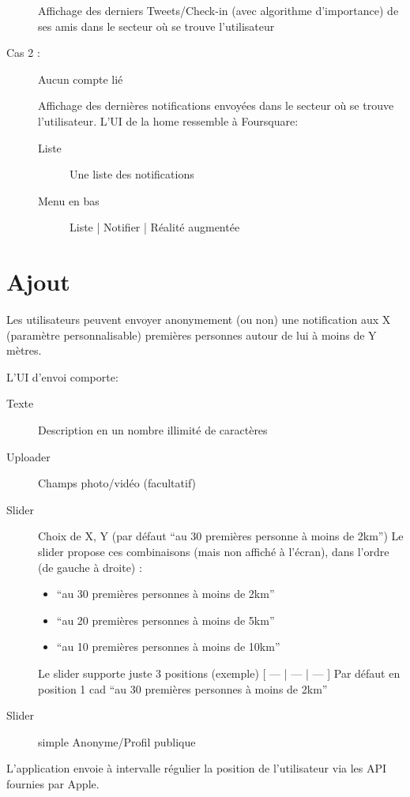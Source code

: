 \documentclass[a4paper,12pt]{report}
\begin{document}
\begin{onehalfspace}
\begin{description}
    Affichage des derniers Tweets/Check-in (avec algorithme d’importance) de ses amis dans le secteur où se trouve l’utilisateur

    \item[Cas 2 :] Aucun compte lié

    Affichage des dernières notifications envoyées dans le secteur où se trouve l’utilisateur.
    L’UI de la home ressemble à Foursquare:
      \begin{description}
      \item[Liste] Une liste des notifications
      \item[Menu en bas] Liste | Notifier | Réalité augmentée
      \end{description}
  \end{description}


  \section*{Ajout}
  Les utilisateurs peuvent envoyer anonymement (ou non) une notification aux X (paramètre personnalisable) premières personnes autour de lui à moins de Y mètres.

  L’UI d’envoi comporte:
    \begin{description}
    \item[Texte] Description en un nombre illimité de caractères
    \item[Uploader] Champs photo/vidéo (facultatif)
    \item[Slider] Choix de X, Y (par défaut “au 30 premières personne à moins de 2km”)
    Le slider propose ces combinaisons (mais non affiché à l’écran), dans l’ordre (de gauche à droite) :
      \begin{itemize}
      \item “au 30 premières personnes à moins de 2km”
      \item “au 20 premières personnes à moins de 5km”
      \item “au 10 premières personnes à moins de 10km”
      \end{itemize}
    Le slider supporte juste 3 positions (exemple) [ --- | --- | --- ]
    Par défaut en position 1 cad “au 30 premières personnes à moins de 2km”
    \item[Slider] simple Anonyme/Profil publique
    \end{description}

  L’application envoie à intervalle régulier la position de l’utilisateur via les API fournies par Apple.


\end{onehalfspace}
\end{document}
